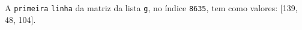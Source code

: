 \documentclass[12pt,varwidth=16cm,border=1pt]{standalone}
\begin{document}
A \verb+primeira+ \verb+linha+ da matriz da lista \verb+g+, no índice \verb+8635+, tem como valores: [139, 48, 104].

\questiomtrue
\end{document}
